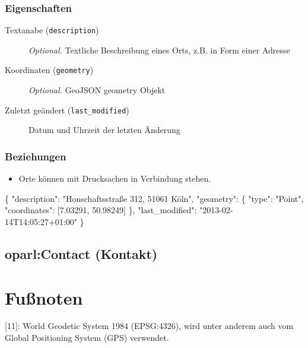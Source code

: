 \documentclass[,a4paper]{article}
\newenvironment{Shaded}{}{}
\newcommand{\DataTypeTok}[1]{\textcolor[rgb]{0.56,0.13,0.00}{{#1}}}
\newcommand{\FloatTok}[1]{\textcolor[rgb]{0.25,0.63,0.44}{{#1}}}
\newcommand{\StringTok}[1]{\textcolor[rgb]{0.25,0.44,0.63}{{#1}}}
\newcommand{\NormalTok}[1]{{#1}}
\begin{document}
\subsubsection{Eigenschaften}

\begin{description}
\item[Textanabe (\texttt{description})]
\emph{Optional.} Textliche Beschreibung eines Orts, z.B. in Form einer
Adresse
\item[Koordinaten (\texttt{geometry})]
\emph{Optional.} GeoJSON geometry Objekt
\item[Zuletzt geändert (\texttt{last\_modified})]
Datum und Uhrzeit der letzten Änderung
\end{description}

\subsubsection{Beziehungen}

\begin{itemize}
\item
  Orte können mit Drucksachen in Verbindung stehen.
\end{itemize}

\begin{Shaded}
\begin{Highlighting}[]
\NormalTok{\{}
    \DataTypeTok{"description"}\NormalTok{: }\StringTok{"Honschaftsstraße 312, 51061 Köln"}\NormalTok{,}
    \DataTypeTok{"geometry"}\NormalTok{: \{}
        \DataTypeTok{"type"}\NormalTok{: }\StringTok{"Point"}\NormalTok{,}
        \DataTypeTok{"coordinates"}\NormalTok{: [}\FloatTok{7.03291}\NormalTok{, }\FloatTok{50.98249}\NormalTok{]}
    \NormalTok{\},}
    \DataTypeTok{"last_modified"}\NormalTok{: }\StringTok{"2013-02-14T14:05:27+01:00"}
\NormalTok{\}}
\end{Highlighting}
\end{Shaded}

\subsection{oparl:Contact (Kontakt)}

\section{Fußnoten}

{[}11{]}: World Geodetic System 1984 (EPSG:4326), wird unter anderem
auch vom Global Positioning System (GPS) verwendet.
\end{document}
